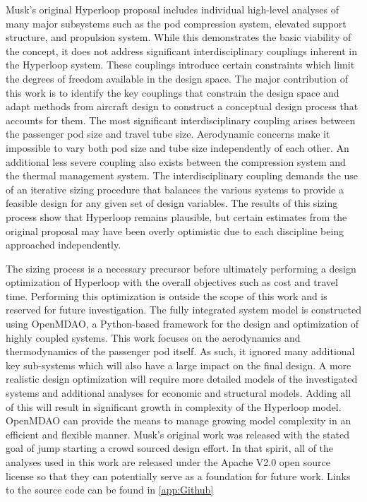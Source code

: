 \documentclass[heading.tex]{subfiles}
\begin{document}
Musk's original Hyperloop proposal includes individual high-level analyses of many major subsystems such as the pod compression system,
elevated support structure, and propulsion system. While this demonstrates the basic viability of the concept, it does not address
significant interdisciplinary couplings inherent in the Hyperloop system. These couplings introduce certain constraints which limit the 
degrees of freedom available in the design space. The major contribution of this work is to identify the key couplings that constrain the design space
and adapt methods from aircraft design to construct a conceptual design process that accounts for them. The most significant 
interdisciplinary coupling arises between the passenger pod size and travel tube size. Aerodynamic concerns make it impossible to vary 
both pod size and tube size independently of each other. An additional less severe coupling also exists between the compression system and 
the thermal management system. The interdisciplinary coupling demands the use of an iterative sizing procedure that balances 
the various systems to provide a feasible design for any given set of design variables. The results of this sizing process show that
Hyperloop remains plausible, but certain estimates from the original proposal may have been overly optimistic due to each discipline being approached independently. 

The sizing process is a necessary precursor before ultimately performing a design optimization of 
Hyperloop with the overall objectives such as cost and travel time. Performing this optimization 
is outside the scope of this work and is reserved for future investigation. 
The fully integrated system model is constructed using OpenMDAO, a Python-based framework for 
the design and optimization of highly coupled systems\cite{GrayBenchmarking2013}. 
This work focuses on the aerodynamics and thermodynamics of the passenger pod itself.
As such, it ignored many additional key sub-systems which will also have a large impact on the final design.
A more realistic design optimization will require more detailed models of the investigated systems and additional analyses for economic and 
structural models. Adding all of this will result in significant growth in complexity of the Hyperloop model. 
OpenMDAO can provide the means to manage growing model complexity 
in an efficient and flexible manner. Musk's original work was released with the stated goal of jump starting
a crowd sourced design effort. In that spirit, all of the analyses used in this work are released under
the Apache V2.0 open source license so that they can potentially serve as a foundation for future work. 
Links to the source code can be found in \cref{app:Github}
\end{document}
